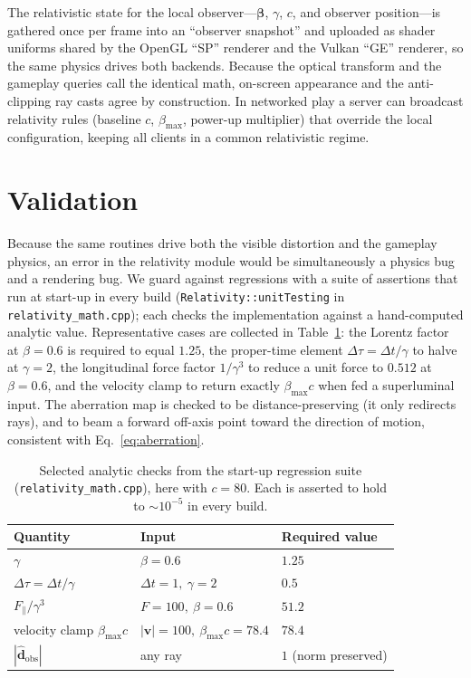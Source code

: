 \documentclass[aip,amsmath,amssymb,reprint,nofootinbib]{revtex4-2}
\begin{document}
The relativistic state for the local observer---$\bm{\beta}$, $\gamma$, $c$, and
observer position---is gathered once per frame into an ``observer snapshot'' and
uploaded as shader uniforms shared by the OpenGL ``SP'' renderer and the Vulkan
``GE'' renderer, so the same physics drives both backends. Because the optical
transform and the gameplay queries call the identical math, on-screen appearance
and the anti-clipping ray casts agree by construction. In networked play a server
can broadcast relativity rules (baseline $c$, $\beta_{\max}$, power-up
multiplier) that override the local configuration, keeping all clients in a common
relativistic regime.

\section{Validation}\label{sec:validation}

Because the same routines drive both the visible distortion and the gameplay
physics, an error in the relativity module would be simultaneously a physics bug
and a rendering bug. We guard against regressions with a suite of assertions that
run at start-up in every build (\texttt{Relativity::unitTesting} in
\texttt{relativity\_math.cpp}); each checks the implementation against a
hand-computed analytic value. Representative cases are collected in
Table~\ref{tab:validation}: the Lorentz factor at $\beta=0.6$ is required to equal
$1.25$, the proper-time element $\Delta\tau=\Delta t/\gamma$ to halve at
$\gamma=2$, the longitudinal force factor $1/\gamma^3$ to reduce a unit force to
$0.512$ at $\beta=0.6$, and the velocity clamp to return exactly $\beta_{\max}c$
when fed a superluminal input. The aberration map is checked to be
distance-preserving (it only redirects rays), and to beam a forward off-axis point
toward the direction of motion, consistent with Eq.~\eqref{eq:aberration}.

\begin{table}[t]
\caption{Selected analytic checks from the start-up regression suite
(\texttt{relativity\_math.cpp}), here with $c=80$. Each is asserted to hold to
$\sim10^{-5}$ in every build.}
\label{tab:validation}
\begin{ruledtabular}
\begin{tabular}{lll}
Quantity & Input & Required value \\
\hline
$\gamma$                       & $\beta=0.6$             & $1.25$ \\
$\Delta\tau=\Delta t/\gamma$   & $\Delta t=1,\ \gamma=2$ & $0.5$ \\
$F_\parallel/\gamma^3$         & $F=100,\ \beta=0.6$     & $51.2$ \\
velocity clamp $\beta_{\max}c$ & $|\bm v|=100,\ \beta_{\max}c=78.4$ & $78.4$ \\
$|\hat{\bm d}_{\mathrm{obs}}|$ & any ray                 & $1$ (norm preserved) \\
\end{tabular}
\end{ruledtabular}
\end{table}
\end{document}
